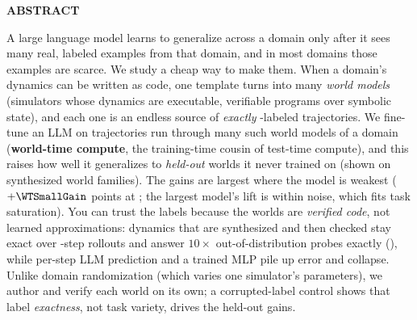 \documentclass[11pt]{article}
\begin{document}
\vspace{0.15em}
\begin{tcolorbox}[breakable, enhanced, colback=white, colframe=black!12,
  arc=3pt, boxrule=0.5pt, left=18pt, right=16pt, top=5pt, bottom=5pt,
  borderline west={3pt}{0pt}{cardblue}, drop fuzzy shadow=black!18]
\setlength{\parskip}{0pt}
{\sffamily\bfseries\color{cardblue} ABSTRACT}\par
\smallskip
\fontsize{9.0}{10.7}\selectfont
A large language model learns to generalize across a domain only after it sees many real,
labeled examples from that domain, and in most domains those examples are scarce. We study a
cheap way to make them. When a domain's dynamics can be written as code, one template turns
into many \emph{world models} (simulators whose dynamics are executable,
verifiable programs over symbolic state), and each one is an endless source of \emph{exactly}%
-labeled trajectories. We fine-tune an LLM on trajectories run through many such world
models of a domain (\textbf{world-time compute}, the training-time cousin of
test-time compute), and this raises how well it generalizes to \emph{held-out} worlds it never trained on (shown on
synthesized world families). The gains are largest where the model is weakest
($+\WTSmallGain$ points at \WTSmallName; the largest model's lift is within noise, which fits
task saturation). You can trust the labels because the worlds are \emph{verified code}, not
learned approximations: dynamics that are synthesized and then checked stay exact over
\RolloutSteps-step rollouts and answer $10\times$ out-of-distribution probes exactly
(\CodeOODRate), while per-step LLM prediction and a trained MLP pile up error and
collapse. Unlike domain randomization (which varies one simulator's parameters), we author
and verify each world on its own; a corrupted-label control shows that label \emph{exactness}, not
task variety, drives the held-out gains.


\end{tcolorbox}
\end{document}

